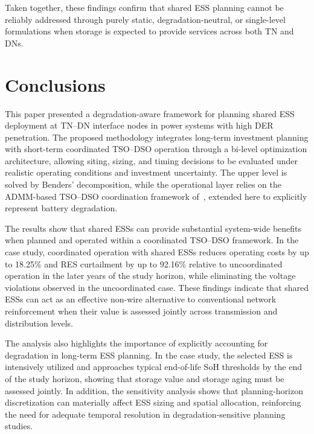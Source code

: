 \documentclass[preprint,12pt]{elsarticle}
\begin{document}
Taken together, these findings confirm that shared ESS planning cannot be reliably addressed through purely static, degradation-neutral, or single-level formulations when storage is expected to provide services across both TN and DNs.


\section{Conclusions}
\label{sec:conclusions}

This paper presented a degradation-aware framework for planning shared ESS deployment at TN--DN interface nodes in power systems with high DER penetration. 
The proposed methodology integrates long-term investment planning with short-term coordinated TSO--DSO operation through a bi-level optimization architecture, allowing siting, sizing, and timing decisions to be evaluated under realistic operating conditions and investment uncertainty. 
The upper level is solved by Benders' decomposition, while the operational layer relies on the ADMM-based TSO--DSO coordination framework of~\cite{simoes_2023}, extended here to explicitly represent battery degradation. 

The results show that shared ESSs can provide substantial system-wide benefits when planned and operated within a coordinated TSO--DSO framework. In the case study, coordinated operation with shared ESSs reduces operating costs by up to 18.25\% and RES curtailment by up to 92.16\% relative to uncoordinated operation in the later years of the study horizon, while eliminating the voltage violations observed in the uncoordinated case. These findings indicate that shared ESSs can act as an effective non-wire alternative to conventional network reinforcement when their value is assessed jointly across transmission and distribution levels.

The analysis also highlights the importance of explicitly accounting for degradation in long-term ESS planning. In the case study, the selected ESS is intensively utilized and approaches typical end-of-life SoH thresholds by the end of the study horizon, showing that storage value and storage aging must be assessed jointly. In addition, the sensitivity analysis shows that planning-horizon discretization can materially affect ESS sizing and spatial allocation, reinforcing the need for adequate temporal resolution in degradation-sensitive planning studies.
\end{document}

